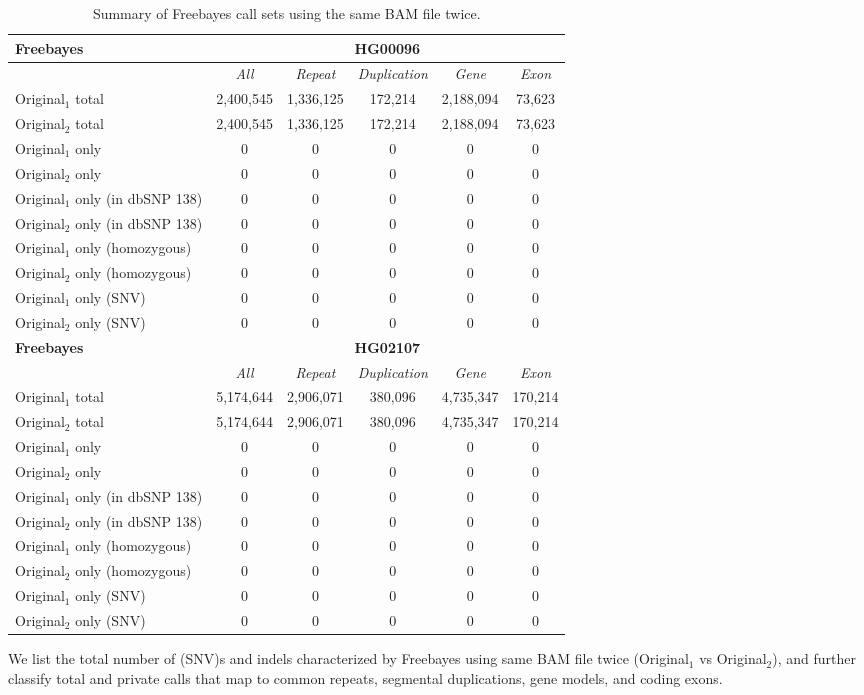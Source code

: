 \begin{table}[htb]
\caption{ Summary of Freebayes call sets using the same BAM file twice. }
\begin{center}
\begin{tabular}{|l|c||c|c|c|c|}
\hline
{\bf Freebayes} & \multicolumn{5}{|c|}{\bf HG00096} \\
\hline
\cline{2-6}
{\bf} & {\it All} & {\it Repeat} & {\it Duplication} & {\it Gene} & {\it Exon} \\
\hline
Original$_1$ total & 2,400,545 & 1,336,125 & 172,214 & 2,188,094 & 73,623\\ 
\hline
Original$_2$ total & 2,400,545 & 1,336,125 & 172,214 & 2,188,094 & 73,623\\ 
\hline
Original$_1$ only & 0 & 0 & 0 & 0 & 0\\ 
\hline
Original$_2$ only & 0 & 0 & 0 & 0 & 0\\ 
\hline
Original$_1$ only (in dbSNP 138) & 0 & 0 & 0 & 0 & 0\\ 
\hline
Original$_2$ only (in dbSNP 138) & 0 & 0 & 0 & 0 & 0\\ 
\hline
Original$_1$ only (homozygous) & 0 & 0 & 0 & 0 & 0\\ 
\hline
Original$_2$ only (homozygous) & 0 & 0 & 0 & 0 & 0\\ 
\hline
Original$_1$ only (SNV) & 0 & 0 & 0 & 0 & 0\\ 
\hline
Original$_2$ only (SNV) & 0 & 0 & 0 & 0 & 0\\ 
\hline
\hline
{\bf Freebayes} & \multicolumn{5}{|c|}{\bf HG02107} \\
\hline
\cline{2-6}
{\bf} & {\it All} & {\it Repeat} & {\it Duplication} & {\it Gene} & {\it Exon} \\
\hline
Original$_1$ total & 5,174,644 & 2,906,071 & 380,096 & 4,735,347 & 170,214\\ 
\hline
Original$_2$ total & 5,174,644 & 2,906,071 & 380,096 & 4,735,347 & 170,214\\ 
\hline
Original$_1$ only & 0 & 0 & 0 & 0 & 0\\ 
\hline
Original$_2$ only & 0 & 0 & 0 & 0 & 0\\ 
\hline
Original$_1$ only (in dbSNP 138) & 0 & 0 & 0 & 0 & 0\\ 
\hline
Original$_2$ only (in dbSNP 138) & 0 & 0 & 0 & 0 & 0\\ 
\hline
Original$_1$ only (homozygous) & 0 & 0 & 0 & 0 & 0\\ 
\hline
Original$_2$ only (homozygous) & 0 & 0 & 0 & 0 & 0\\ 
\hline
Original$_1$ only (SNV) & 0 & 0 & 0 & 0 & 0\\ 
\hline
Original$_2$ only (SNV) & 0 & 0 & 0 & 0 & 0\\ 
\hline
\end{tabular}
\end{center}
{\footnotesize We list the total number of (SNV)s and indels characterized by Freebayes using same BAM file twice (Original$_1$ vs Original$_2$), 
and further classify total and private calls that map to common repeats, segmental duplications, gene models, and coding exons.}
\label{supptab:orig-vs-orig2-freebayes}
\end{table}

